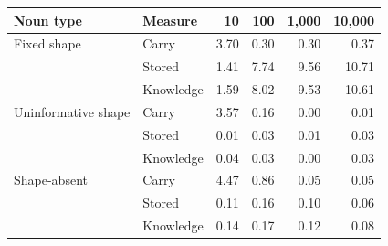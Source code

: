 \begin{tabular}{@{}llrrrr@{}}
\toprule
Noun type & Measure & 10 & 100 & 1,000 & 10,000 \\
\midrule
Fixed shape & Carry & 3.70 & 0.30 & \textminus{}0.30 & \textminus{}0.37 \\
 & Stored & 1.41 & 7.74 & 9.56 & 10.71 \\
 & Knowledge & 1.59 & 8.02 & 9.53 & 10.61 \\
Uninformative shape & Carry & 3.57 & 0.16 & 0.00 & \textminus{}0.01 \\
 & Stored & 0.01 & \textminus{}0.03 & \textminus{}0.01 & 0.03 \\
 & Knowledge & 0.04 & \textminus{}0.03 & \textminus{}0.00 & 0.03 \\
Shape-absent & Carry & 4.47 & 0.86 & 0.05 & \textminus{}0.05 \\
 & Stored & 0.11 & \textminus{}0.16 & 0.10 & 0.06 \\
 & Knowledge & \textminus{}0.14 & \textminus{}0.17 & 0.12 & 0.08 \\
\bottomrule
\end{tabular}
